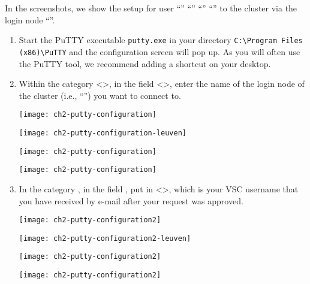   In the screenshots, we show the setup for user
\ifantwerpen
``''
\fi
\ifbrussel
``''
\fi
\ifgent
``''
\fi
\ifleuven
``''
\fi
  to the \hpc cluster via the login node
  ``\strong{\emph{\loginnode}}''.

  \begin{enumerate}
    \item  Start the PuTTY executable \lstinline|putty.exe| in your
      directory \lstinline|C:\Program Files (x86)\PuTTY| and the
      configuration screen will pop up. As you will often use the PuTTY tool,
      we recommend adding a shortcut on your desktop.
    \item  Within the category <{}>{}, in the field
      <{}>{}, enter the name of the login node of the
      \hpc cluster (i.e., ``\strong{\emph{\loginnode}}'')
      you want to connect to.

\ifantwerpen
      \begin{center}
      \texttt{[image: ch2-putty-configuration]}
      \end{center}
\fi
\ifleuven
      \begin{center}
      \texttt{[image: ch2-putty-configuration-leuven]}
      \end{center}
\fi
\ifbrussel
      \begin{center}
      \texttt{[image: ch2-putty-configuration]}
      \end{center}
\fi
\ifgent
      \begin{center}
      \texttt{[image: ch2-putty-configuration]}
      \end{center}
\fi

    \item  In the category , in
      the field , put in
      <{}\emph{\userid}>{}, which is your VSC username that you have
      received by e-mail after your request was approved.

\ifantwerpen
      \begin{center}
      \texttt{[image: ch2-putty-configuration2]}
      \end{center}
\fi
\ifleuven
      \begin{center}
      \texttt{[image: ch2-putty-configuration2-leuven]}
      \end{center}
\fi
\ifbrussel
      \begin{center}
      \texttt{[image: ch2-putty-configuration2]}
      \end{center}
\fi
\ifgent
      \begin{center}
      \texttt{[image: ch2-putty-configuration2]}
      \end{center}
\fi


\end{enumerate}
